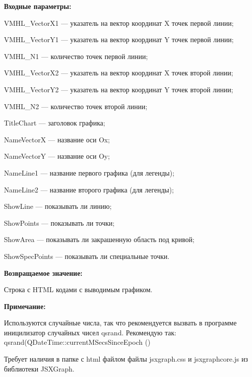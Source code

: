 \documentclass[a4paper,12pt]{article}
\begin{document}
\textbf{Входные параметры:}
 
    VMHL\_VectorX1 --- указатель на вектор координат X точек первой линии;
 
    VMHL\_VectorY1 --- указатель на вектор координат Y точек первой линии;
 
    VMHL\_N1 --- количество точек первой линии;
 
    VMHL\_VectorX2 --- указатель на вектор координат X точек второй линии;
 
    VMHL\_VectorY2 --- указатель на вектор координат Y точек второй линии;
 
    VMHL\_N2 --- количество точек второй линии;
 
    TitleChart --- заголовок графика;
 
    NameVectorX --- название оси Ox;
 
    NameVectorY --- название оси Oy;
 
    NameLine1 --- название первого графика (для легенды);
 
    NameLine2 --- название второго графика (для легенды);
 
    ShowLine --- показывать ли линию;
 
    ShowPoints --- показывать ли точки;
 
    ShowArea --- показывать ли закрашенную область под кривой;
 
    ShowSpecPoints --- показывать ли специальные точки.

\textbf{Возвращаемое значение:}

Строка с HTML кодами с выводимым графиком.

\textbf{Примечание:}

Используются случайные числа, так что рекомендуется вызвать в программе иницилизатор случайных чисел qsrand. Рекомендую так: qsrand(QDateTime::currentMSecsSinceEpoch () %

Требует наличия в папке с html файлом файлы jsxgraph.css и jsxgraphcore.js из библиотеки JSXGraph.
\end{document}
